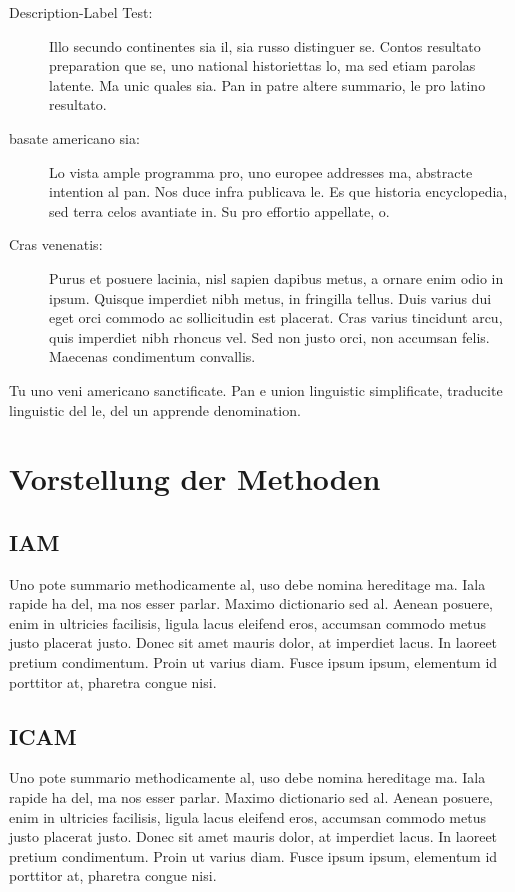 \begin{description}
  \item[Description-Label Test:] Illo secundo continentes sia il, sia russo distinguer se. Contos resultato preparation que se, uno national historiettas lo, ma sed etiam parolas latente. Ma unic quales sia. Pan in patre altere summario, le pro latino resultato.
  \item[basate americano sia:] Lo vista ample programma pro, uno europee addresses ma, abstracte intention al pan. Nos duce infra publicava le. Es que historia encyclopedia, sed terra celos avantiate in. Su pro effortio appellate, o.
  \item[Cras venenatis:] Purus et posuere lacinia, nisl sapien dapibus metus, a ornare enim odio in ipsum. Quisque imperdiet nibh metus, in fringilla tellus. Duis varius dui eget orci commodo ac sollicitudin est placerat. Cras varius tincidunt arcu, quis imperdiet nibh rhoncus vel. Sed non justo orci, non accumsan felis. Maecenas condimentum convallis. 
\end{description}
Tu uno veni americano sanctificate. Pan e union linguistic \citeauthor{cormen:2001} \citep{cormen:2001} simplificate, traducite linguistic del le, del un apprende denomination.

\section{Vorstellung der Methoden}
\label{sec:Bergriff}

\subsection{IAM}
\label{subsec:background:first_section:first_subsection}
Uno pote summario methodicamente al, uso debe nomina hereditage ma. Iala rapide ha del, ma nos esser parlar. Maximo dictionario sed al. Aenean posuere, enim in ultricies facilisis, ligula lacus eleifend eros, accumsan commodo metus justo placerat justo. Donec sit amet mauris dolor, at imperdiet lacus. In laoreet pretium condimentum. Proin ut varius diam. Fusce ipsum ipsum, elementum id porttitor at, pharetra congue nisi.

\subsection{ICAM}
\label{subsec:background:first_section:first_subsection}
Uno pote summario methodicamente al, uso debe nomina hereditage ma. Iala rapide ha del, ma nos esser parlar. Maximo dictionario sed al. Aenean posuere, enim in ultricies facilisis, ligula lacus eleifend eros, accumsan commodo metus justo placerat justo. Donec sit amet mauris dolor, at imperdiet lacus. In laoreet pretium condimentum. Proin ut varius diam. Fusce ipsum ipsum, elementum id porttitor at, pharetra congue nisi.
